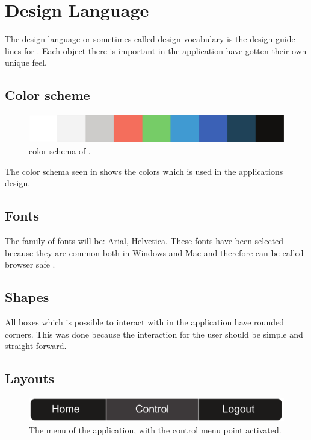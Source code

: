 \section{Design Language}

The design language or sometimes called design vocabulary is the design guide lines for \projectname{}. Each object there is important in the application have gotten their own unique feel.

\subsection{Color scheme}

\begin{figure}[htb]
    \centering
    \includegraphics[width=\textwidth]{gfx/color_schema.pdf}
    \caption{color schema of \projectname{}.}
    \label{fig:color_schema}
\end{figure}

The color schema seen in  shows the colors which is used in the applications design.

\subsection{Fonts}

The family of fonts will be: Arial, Helvetica. These fonts have been selected because they are common both in Windows and Mac and therefore can be called browser safe \cite{common_fonts}.

\subsection{Shapes}

All boxes which is possible to interact with in the application have rounded corners. This was done because the interaction for the user should be simple and straight forward.

\subsection{Layouts}

\begin{figure}[htb]
    \centering
    \includegraphics[width=\textwidth]{gfx/menu.pdf}
    \caption{The menu of the application, with the control menu point activated.}
    \label{fig:menu_design}
\end{figure}

